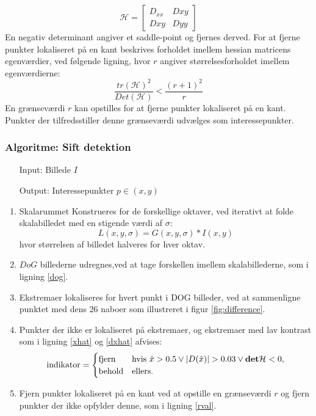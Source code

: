 \begin{equation}
\mathcal{H} =
\begin{bmatrix}
D_{xx} & D{xy} \\
D{xy} & D{yy}
\end{bmatrix}
\end{equation}
En negativ determinant angiver et saddle-point og fjernes derved. For at fjerne punkter lokaliseret på en kant beskrives forholdet imellem hessian matricens egenværdier, ved følgende ligning, hvor $r$ angiver størrelsesforholdet imellem egenværdierne:
\begin{equation}
\dfrac{tr(\mathcal{H})^2}{Det(\mathcal{H})}<\dfrac{(r+1)^2}{r}
\label{rval}
\end{equation}
En grænseværdi $r$ kan opstilles for at fjerne punkter lokaliseret på en kant. Punkter der tilfredsstiller denne grænseværdi udvælges som interessepunkter.
\subsubsection{Algoritme: Sift detektion}
\begin{enumerate}
\item[Input:] Billede $I$
\item[Output:] Interessepunkter $p \in (x,y)$
\end{enumerate}
\begin{enumerate}
\item{Skalarummet Konstrueres for de forskellige oktaver, ved iterativt at folde skalabilledet med en stigende værdi af $\sigma$: $$ L(x,y,\sigma)= G(x,y,\sigma) \ast I(x,y) $$
hvor størrelsen af billedet halveres for hver oktav.}
\item{$DoG$ billederne udregnes,ved at tage forskellen imellem skalabillederne, som i ligning \eqref{dog}.}
\item{Ekstremaer lokaliseres for hvert punkt i DOG billeder, ved at sammenligne punktet med dens 26 naboer som illustreret i figur \ref{fig:difference}.}
\item{Punkter der ikke er lokaliseret på ekstremaer, og ekstremaer med lav kontrast som i ligning \eqref{xhat} og \eqref{dxhat} afvises:
\begin{equation}
\begin{split}
\text{indikator} = 
\begin{cases}
\text{fjern}& \text{hvis } \hat{x}>0.5 \lor |D(\hat{x})|>0.03 \lor \bold{det} \mathcal{H}<0 , \\
\text{behold}& \text{ellers}. 
\end{cases}
\end{split}
\label{maxsurp}
\end{equation}
}
\item{Fjern punkter lokaliseret på en kant ved at opstille en grænseværdi $r$ og fjern punkter der ikke opfylder denne, som i ligning \eqref{rval}.}
\end{enumerate}